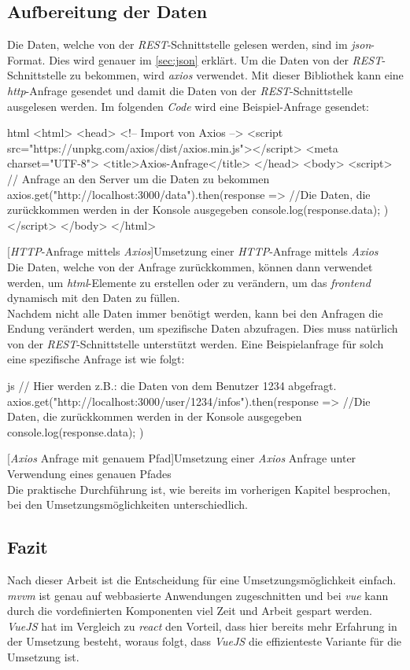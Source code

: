 \subsection{Aufbereitung der Daten}
Die Daten, welche von der \textit{REST}-Schnittstelle gelesen werden, sind im \textit{\Gls{json}}-Format. Dies wird genauer im \autoref{sec:json} erklärt. Um die Daten von der \textit{REST}-Schnittstelle zu bekommen, wird \textit{\Gls{axios}} verwendet. Mit dieser Bibliothek kann eine \textit{\Gls{http}}-Anfrage gesendet und damit die Daten von der \textit{REST}-Schnittstelle ausgelesen werden. Im folgenden \textit{Code} wird eine Beispiel-Anfrage gesendet:
\begin{code}{html}
	<html>
		<head>
			<!-- Import von Axios -->
			<script src="https://unpkg.com/axios/dist/axios.min.js"></script>
			<meta charset="UTF-8">
			<title>Axios-Anfrage</title>
		</head>
		<body>
			<script>
				// Anfrage an den Server um die Daten zu bekommen
				axios.get("http://localhost:3000/data").then(response => {
					//Die Daten, die zurückkommen werden in der Konsole ausgegeben
					console.log(response.data);
				})
			</script>
		</body>
	</html>
\end{code}
[\textit{HTTP}-Anfrage mittels \textit{Axios}]{Umsetzung einer \textit{HTTP}-Anfrage mittels \textit{Axios}}~\\
Die Daten, welche von der Anfrage zurückkommen, können dann verwendet werden, um \textit{\Gls{html}}-Elemente zu erstellen oder zu verändern, um das \textit{\Gls{frontend}} dynamisch mit den Daten zu füllen.\\Nachdem nicht alle Daten immer benötigt werden, kann bei den Anfragen die Endung verändert werden, um spezifische Daten abzufragen. Dies muss natürlich von der \textit{REST}-Schnittstelle unterstützt werden. Eine Beispielanfrage für solch eine spezifische Anfrage ist wie folgt:
\begin{code}{js}
	// Hier werden z.B.: die Daten von dem Benutzer 1234 abgefragt.
	axios.get("http://localhost:3000/user/1234/infos").then(response => {
		//Die Daten, die zurückkommen werden in der Konsole ausgegeben
		console.log(response.data);
	})
\end{code}
[\textit{Axios} Anfrage mit genauem Pfad]{Umsetzung einer \textit{Axios} Anfrage unter Verwendung eines genauen Pfades}~\\
Die praktische Durchführung ist, wie bereits im vorherigen Kapitel besprochen, bei den Umsetzungsmöglichkeiten unterschiedlich.
\subsection{Fazit}
\label{sec:rfoster_fazit}
Nach dieser Arbeit ist die Entscheidung für eine Umsetzungsmöglichkeit einfach. \textit{\Gls{mvvm}} ist genau auf webbasierte Anwendungen zugeschnitten und bei \textit{\Gls{vue}} kann durch die vordefinierten Komponenten viel Zeit und Arbeit gespart werden. \textit{VueJS} hat im Vergleich zu \textit{\Gls{react}} den Vorteil, dass hier bereits mehr Erfahrung in der Umsetzung besteht, woraus folgt, dass \textit{VueJS} die effizienteste Variante für die Umsetzung ist.